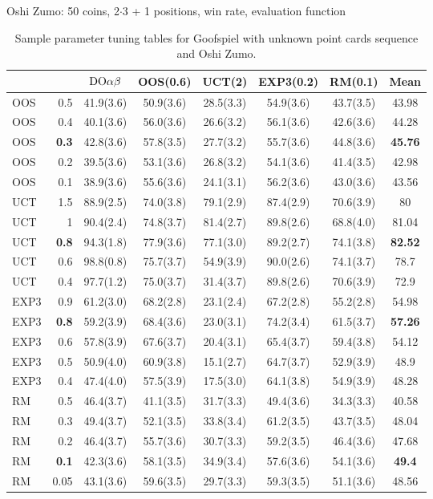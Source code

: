 \begin{table}
\begin{scriptsize}
Oshi Zumo: 50 coins, 2$\cdot$3 + 1 positions, win rate, evaluation function
\begin{tabular}{|lr|ccccc|c|}\hline
&&$\textrm{DO}\alpha\beta$&OOS(0.6)&UCT(2)&EXP3(0.2)&RM(0.1)&Mean\\\hline
OOS&0.5&41.9(3.6)&50.9(3.6)&28.5(3.3)&54.9(3.6)&43.7(3.5)&43.98\\
OOS&0.4&40.1(3.6)&56.0(3.6)&26.6(3.2)&56.1(3.6)&42.6(3.6)&44.28\\
OOS&\textbf{0.3}&42.8(3.6)&57.8(3.5)&27.7(3.2)&55.7(3.6)&44.8(3.6)&\textbf{45.76}\\
OOS&0.2&39.5(3.6)&53.1(3.6)&26.8(3.2)&54.1(3.6)&41.4(3.5)&42.98\\
OOS&0.1&38.9(3.6)&55.6(3.6)&24.1(3.1)&56.2(3.6)&43.0(3.6)&43.56\\\hline
UCT&1.5&88.9(2.5)&74.0(3.8)&79.1(2.9)&87.4(2.9)&70.6(3.9)&80\\
UCT&1&90.4(2.4)&74.8(3.7)&81.4(2.7)&89.8(2.6)&68.8(4.0)&81.04\\
UCT&\textbf{0.8}&94.3(1.8)&77.9(3.6)&77.1(3.0)&89.2(2.7)&74.1(3.8)&\textbf{82.52}\\
UCT&0.6&98.8(0.8)&75.7(3.7)&54.9(3.9)&90.0(2.6)&74.1(3.7)&78.7\\
UCT&0.4&97.7(1.2)&75.0(3.7)&31.4(3.7)&89.8(2.6)&70.6(3.9)&72.9\\\hline
EXP3&0.9&61.2(3.0)&68.2(2.8)&23.1(2.4)&67.2(2.8)&55.2(2.8)&54.98\\
EXP3&\textbf{0.8}&59.2(3.9)&68.4(3.6)&23.0(3.1)&74.2(3.4)&61.5(3.7)&\textbf{57.26}\\
EXP3&0.6&57.8(3.9)&67.6(3.7)&20.4(3.1)&65.4(3.7)&59.4(3.8)&54.12\\
EXP3&0.5&50.9(4.0)&60.9(3.8)&15.1(2.7)&64.7(3.7)&52.9(3.9)&48.9\\
EXP3&0.4&47.4(4.0)&57.5(3.9)&17.5(3.0)&64.1(3.8)&54.9(3.9)&48.28\\\hline
RM&0.5&46.4(3.7)&41.1(3.5)&31.7(3.3)&49.4(3.6)&34.3(3.3)&40.58\\
RM&0.3&49.4(3.7)&52.1(3.5)&33.8(3.4)&61.2(3.5)&43.7(3.5)&48.04\\
RM&0.2&46.4(3.7)&55.7(3.6)&30.7(3.3)&59.2(3.5)&46.4(3.6)&47.68\\
RM&\textbf{0.1}&42.3(3.6)&58.1(3.5)&34.9(3.4)&57.6(3.6)&54.1(3.6)&\textbf{49.4}\\
RM&0.05&43.1(3.6)&59.6(3.5)&29.7(3.3)&59.3(3.5)&51.1(3.6)&48.56\\
\hline
\end{tabular}

\end{scriptsize}
\caption{Sample parameter tuning tables for Goofspiel with unknown point cards sequence and Oshi Zumo.}\label{fig:tuning}
\end{table}

